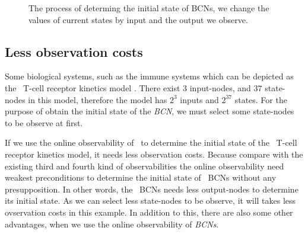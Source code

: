 \begin{figure}[thpb]
      \centering
      
      \caption{The process of determing the initial state of BCNs, we change the values of current states by input and the output we observe. }
      \label{fig:5}
   \end{figure}
\subsection{Less observation costs}
Some biological systems, such as the immune systems which can be depicted as the \BCN\ T-cell receptor kinetics model \cite{Klamt2006A}. There exist $3$ input-nodes, and $37$ state-nodes in this model, therefore the model has $2^3$ inputs and $2^{37}$ states. For the purpose of obtain the initial state of the {\em BCN}, we must select some state-nodes to be observe at first. 

If we use the online observability of \BCNs\ to determine the initial state of the \BCN\ T-cell receptor kinetics model, it needs less observation costs. Because compare with the existing third and fourth kind of observabilities the online observability need weakest preconditions to determine the initial state of {\ BCNs} without any presupposition. In other words, the {\ BCNs} needs less output-nodes to determine its initial state. As we can select less state-nodes to be observe, it will takes less ovservation costs in this example. In addition to this, there are also some other advantages, when we use the online observability of {\em BCNs}.

